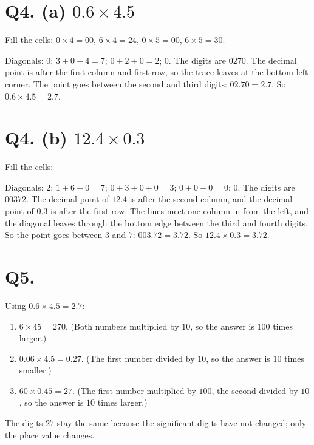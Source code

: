 \documentclass[12pt,a4paper]{article}
\newcommand{\lsetup}[2]{%
  \edef\lC{\the\numexpr#1\relax}\edef\lR{\the\numexpr#2\relax}%
  \edef\lCm{\the\numexpr#1-1\relax}\edef\lRm{\the\numexpr#2-1\relax}}
\newcommand{\lgrid}{%
  \draw[thick] (0,0) rectangle (\lC,\lR);
  \foreach \i in {1,...,\lCm}{\draw (\i,0) -- (\i,\lR);}
  \foreach \j in {1,...,\lRm}{\draw (0,\j) -- (\lC,\j);}
  \foreach \i in {1,...,\lC}{\foreach \j in {1,...,\lR}{%
    \draw[gray!75] ({\i-1},{\j-1}) -- (\i,\j);}}}
\newcommand{\ltop}[2]{\node[font=\small] at ({#1-0.5},{\lR+0.34}) {#2};}
\newcommand{\lside}[2]{\node[font=\small] at ({\lC+0.34},{\lR-#1+0.5}) {#2};}
\newcommand{\lcell}[4]{%
  \node[font=\small] at ({#1-0.72},{\lR-#2+0.70}) {#3};
  \node[font=\small] at ({#1-0.28},{\lR-#2+0.30}) {#4};}
\newcommand{\lleft}[2]{\node[font=\small] at (-0.44,{\lR-#1+0.5}) {#2};}
\newcommand{\lbot}[2]{\node[font=\small] at ({#1-0.5},-0.42) {#2};}
\newcommand{\ltopdot}[1]{\fill (#1,{\lR+0.2}) circle (1.8pt);}
\newcommand{\lsidedot}[1]{\fill ({\lC+0.34},{\lR-#1}) circle (1.8pt);}
\newcommand{\lmeet}[2]{%
  \pgfmathsetmacro{\lmx}{#1}%
  \pgfmathsetmacro{\lmy}{\lR-#2}%
  \pgfmathsetmacro{\lts}{min(\lmx,\lmy)}%
  \pgfmathsetmacro{\lex}{\lmx-\lts}%
  \pgfmathsetmacro{\ley}{\lmy-\lts}%
  \pgfmathsetmacro{\ldx}{\lex<0.5 ? -0.44 : \lex}%
  \pgfmathsetmacro{\ldy}{\ley<0.5 ? -0.42 : \ley}}
\newcommand{\ltrace}[2]{\lmeet{#1}{#2}%
  \draw[red!75!black,dashed,-{Stealth[length=2mm]}] ({\lmx},{\lR+0.1}) -- ({\lmx},{\lmy});
  \draw[red!75!black,dashed,-{Stealth[length=2mm]}] ({\lC+0.12},{\lmy}) -- ({\lmx},{\lmy});
  \ifdim\lts pt>0.1pt
    \draw[red!75!black,dashed,thick,-{Stealth[length=2mm]}] ({\lmx},{\lmy}) -- ({\lex},{\ley});
  \fi
  \fill[red!75!black] ({\ldx},{\ldy}) circle (2.1pt);}
\begin{document}
\section*{Q4. (a) $0.6\times4.5$}
Fill the cells: $0\times4=00$, $6\times4=24$, $0\times5=00$, $6\times5=30$.
\begin{center}
\end{center}
Diagonals: $0$; $3+0+4=7$; $0+2+0=2$; $0$. The digits are $0270$. The decimal point is after the first column and first row, so the trace leaves at the bottom left corner. The point goes between the second and third digits: $02.70=2.7$. So $0.6\times4.5=2.7$.

\section*{Q4. (b) $12.4\times0.3$}
Fill the cells:
\begin{center}
\end{center}
Diagonals: $2$; $1+6+0=7$; $0+3+0+0=3$; $0+0+0=0$; $0$. The digits are $00372$. The decimal point of $12.4$ is after the second column, and the decimal point of $0.3$ is after the first row. The lines meet one column in from the left, and the diagonal leaves through the bottom edge between the third and fourth digits. So the point goes between $3$ and $7$: $003.72=3.72$. So $12.4\times0.3=3.72$.

\section*{Q5.}
Using $0.6\times4.5=2.7$:
\begin{enumerate}[label=(\alph*)]
  \item $6\times45 = 270$. (Both numbers multiplied by $10$, so the answer is $100$ times larger.)
  \item $0.06\times4.5 = 0.27$. (The first number divided by $10$, so the answer is $10$ times smaller.)
  \item $60\times0.45 = 27$. (The first number multiplied by $100$, the second divided by $10$, so the answer is $10$ times larger.)
\end{enumerate}
The digits $27$ stay the same because the significant digits have not changed; only the place value changes.
\end{document}
